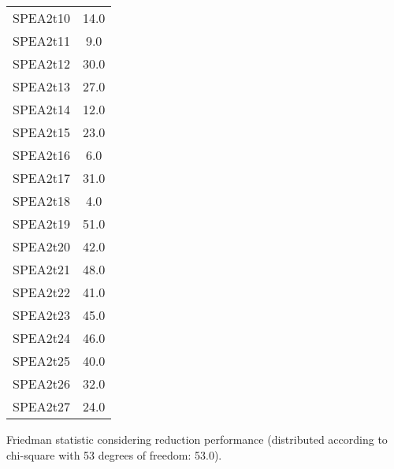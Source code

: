 \documentclass{article}
\begin{document}
\begin{table}[!htp]
\begin{tabular}{c|c}
SPEA2t10&14.0\\
SPEA2t11&9.0\\
SPEA2t12&30.0\\
SPEA2t13&27.0\\
SPEA2t14&12.0\\
SPEA2t15&23.0\\
SPEA2t16&6.0\\
SPEA2t17&31.0\\
SPEA2t18&4.0\\
SPEA2t19&51.0\\
SPEA2t20&42.0\\
SPEA2t21&48.0\\
SPEA2t22&41.0\\
SPEA2t23&45.0\\
SPEA2t24&46.0\\
SPEA2t25&40.0\\
SPEA2t26&32.0\\
SPEA2t27&24.0\\
\end{tabular}
\end{table}


Friedman statistic considering reduction performance (distributed according to chi-square with 53 degrees of freedom: 53.0).
\end{document}
